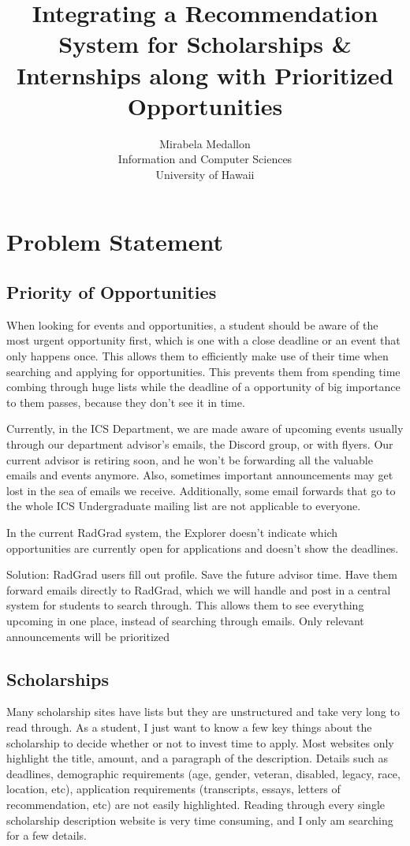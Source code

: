 \documentclass[english]{proposalnsf}
\title{Integrating a Recommendation System for Scholarships \& Internships along with Prioritized Opportunities}
\author{Mirabela Medallon \\ Information and Computer Sciences \\ University of Hawaii}
\begin{document}
	\maketitle
	\tableofcontents
	\newpage
	
	\section{Problem Statement}
	\label{introduction}
	
	\subsection{Priority of Opportunities}
	When looking for events and opportunities, a student should be aware of the most urgent opportunity first, which is one with a close deadline or an event that only happens once. This allows them to efficiently make use of their time when searching and applying for opportunities. This prevents them from spending time combing through huge lists while the deadline of a opportunity of big importance to them passes, because they don't see it in time. 
	
	Currently, in the ICS Department, we are made aware of upcoming events usually through our department advisor's emails,  the Discord group, or with flyers. Our current advisor is retiring soon, and he won't be forwarding all the valuable emails and events anymore. Also, sometimes important announcements may get lost in the sea of emails we receive. Additionally, some email forwards that go to the whole ICS Undergraduate mailing list are not applicable to everyone. 
	
	In the current RadGrad system, the Explorer doesn't indicate which opportunities are currently open for applications and doesn't show the deadlines. 
	
	
	Solution: RadGrad users fill out profile. Save the future advisor time. Have them forward emails directly to RadGrad, which we will handle and post in a central system for students to search through. This allows them to see everything upcoming in one place, instead of searching through emails. Only relevant announcements will be prioritized
	
	\subsection{Scholarships}
	
	Many scholarship sites have lists but they are unstructured and take very long to read through. As a student, I just want to know a few key things about the scholarship to decide whether or not to invest time to apply. Most websites only highlight the title, amount, and a paragraph of the description. Details such as deadlines, demographic requirements (age, gender, veteran, disabled, legacy, race, location, etc), application requirements (transcripts, essays, letters of recommendation, etc) are not easily highlighted. Reading through every single scholarship description website is very time consuming, and I only am searching for a few details.
	
\end{document}
